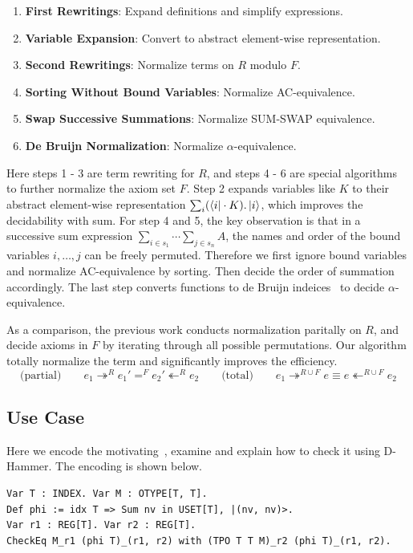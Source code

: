 \begin{enumerate}
    \item \textbf{First Rewritings}: Expand definitions and simplify expressions.
    \item \textbf{Variable Expansion}: Convert to abstract element-wise representation.
    \item \textbf{Second Rewritings}: Normalize terms on \( R \) modulo \( F \).
    \item \textbf{Sorting Without Bound Variables}: Normalize AC-equivalence.
    \item \textbf{Swap Successive Summations}: Normalize SUM-SWAP equivalence.
    \item \textbf{De Bruijn Normalization}: Normalize \( \alpha \)-equivalence.
\end{enumerate}
Here steps 1 - 3 are term rewriting for $R$, and steps 4 - 6 are special algorithms to further normalize the axiom set $F$. Step 2 expands variables like $K$ to their abstract element-wise representation $\sum_{i} (\bra{i} \cdot K). \ket{i}$, which improves the decidability with sum. For step 4 and 5, the key observation is that in a successive sum expression \( \sum_{i \in s_1} \cdots \sum_{j \in s_n} A \), the names and order of the bound variables \( i, \dots, j \) can be freely permuted. Therefore we first ignore bound variables and normalize AC-equivalence by sorting. Then decide the order of summation accordingly. The last step converts functions to de Bruijn indeices~\cite{deBruijn1972lambda} to decide $\alpha$-equivalence.

As a comparison, the previous work conducts normalization paritally on $R$, and decide axioms in $F$ by iterating through all possible permutations.
Our algorithm totally normalize the term and significantly improves the efficiency.
\[
\text{(partial)}\qquad e_1 \mathop{\twoheadrightarrow}^R e_1' \mathop{=}^F e_2' \mathop{\twoheadleftarrow}^R e_2
\qquad
\text{(total)}\qquad e_1 \mathop{\twoheadrightarrow}^{R \cup F} e \equiv e \mathop{\twoheadleftarrow}^{R \cup F} e_2
\]


\subsection{Use Case}
Here we encode the motivating~, examine and explain how to check it using D-Hammer. The encoding is shown below.

    \begin{lstlisting}[style=dhammer]
Var T : INDEX. Var M : OTYPE[T, T].
Def phi := idx T => Sum nv in USET[T], |(nv, nv)>.
Var r1 : REG[T]. Var r2 : REG[T].
CheckEq M_r1 (phi T)_(r1, r2) with (TPO T T M)_r2 (phi T)_(r1, r2).
    \end{lstlisting}        

